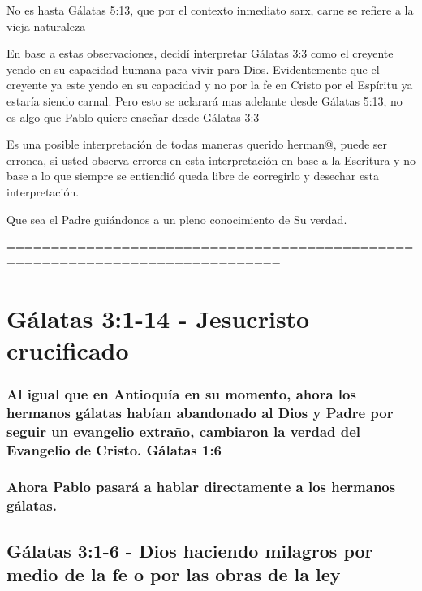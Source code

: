 \documentclass[11a pt,twoside]{article}
\def\emph#1{#1}%
\let\oldsection\section
\renewcommand{\section}{\needspace{6\baselineskip}\oldsection}
\let\oldsubsection\subsection
\renewcommand{\subsection}{\needspace{5\baselineskip}\oldsubsection}
\let\oldsubsubsection\subsubsection
\renewcommand{\subsubsection}{\needspace{4\baselineskip}\oldsubsubsection}
\begin{document}
\emph{No es hasta Gálatas 5:13, que por el contexto inmediato sarx,
carne se refiere a la vieja naturaleza}

\emph{En base a estas observaciones, decidí interpretar Gálatas 3:3 como
el creyente yendo en su capacidad humana para vivir para Dios.
Evidentemente que el creyente ya este yendo en su capacidad y no por la
fe en Cristo por el Espíritu ya estaría siendo carnal. Pero esto se
aclarará mas adelante desde Gálatas 5:13, no es algo que Pablo quiere
enseñar desde Gálatas 3:3}

\emph{Es una posible interpretación de todas maneras querido herman@,
puede ser erronea, si usted observa errores en esta interpretación en
base a la Escritura y no base a lo que siempre se entiendió queda libre
de corregirlo y desechar esta interpretación.}

\emph{Que sea el Padre guiándonos a un pleno conocimiento de Su verdad.}

\emph{=============================================================================}

\section{Gálatas 3:1-14 - Jesucristo
crucificado}\label{guxe1latas-31-14---jesucristo-crucificado}

\subsubsection{Al igual que en Antioquía en su momento, ahora los
hermanos gálatas habían abandonado al Dios y Padre por seguir un
evangelio extraño, cambiaron la verdad del Evangelio de Cristo. Gálatas
1:6}\label{al-igual-que-en-antioquuxeda-en-su-momento-ahora-los-hermanos-guxe1latas-habuxedan-abandonado-al-dios-y-padre-por-seguir-un-evangelio-extrauxf1o-cambiaron-la-verdad-del-evangelio-de-cristo.-guxe1latas-16}

\subsubsection{Ahora Pablo pasará a hablar directamente a los hermanos
gálatas.}\label{ahora-pablo-pasaruxe1-a-hablar-directamente-a-los-hermanos-guxe1latas.}

\subsection{Gálatas 3:1-6 - Dios haciendo milagros por medio de la fe o
por las obras de la
ley}\label{guxe1latas-31-6---dios-haciendo-milagros-por-medio-de-la-fe-o-por-las-obras-de-la-ley}
\end{document}

